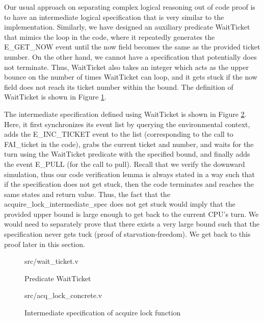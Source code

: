 Our usual approach on separating complex logical reasoning out of code proof is to have an intermediate
logical specification that is very similar to the implementation. Similarly, we have designed an auxiliary predicate
\textsf{WaitTicket} that mimics the loop in the code, where it repeatedly generates the \textsf{E\_GET\_NOW}
event until the \textsf{now} field becomes the same as the provided ticket number. 
On the other hand, we cannot have a specification that potentially does not terminate.
Thus, \textsf{WaitTicket} also takes an integer  which acts as the upper bounce on the
number of times \textsf{WaitTicket} can loop, and it gets stuck if the \textsf{now} field
does not reach its ticket number within the bound.
The definition of \textsf{WaitTicket} is shown in Figure \ref{fig:wait_ticket_v}.

The intermediate specification defined using \textsf{WaitTicket} is shown in Figure \ref{fig:acq_lock_concrete_v}.
Here, it first synchronizes its event list by querying the environmental context, adds the
\textsf{E\_INC\_TICKET} event to the list (corresponding to the call to \textsf{FAI\_ticket} in the code),
grabs the current ticket and number, and waits for the turn using the \textsf{WaitTicket} predicate
with the specified bound, and finally adds the event \textsf{E\_PULL} (for the call to \textsf{pull}).
Recall that we verify the downward simulation, thus our code verification lemma is always stated
in a way such that if the specification does not get stuck, then the code terminates and reaches
the same states and return value. Thus, the fact that the \textsf{acquire\_lock\_intermediate\_spec}
does not get stuck would imply that the provided upper bound is large enough to get back to
the current CPU's turn. We would need to separately prove that there exists a very large bound
such that the specification never gets tuck (proof of starvation-freedom). We get back to this proof later
in this section.

\begin{figure}
	 {src/wait_ticket.v}
	\caption{Predicate WaitTicket}
	\label{fig:wait_ticket_v}
\end{figure}

\begin{figure}
	 {src/acq_lock_concrete.v}
	\caption{Intermediate specification of acquire lock function}
	\label{fig:acq_lock_concrete_v}
\end{figure}

